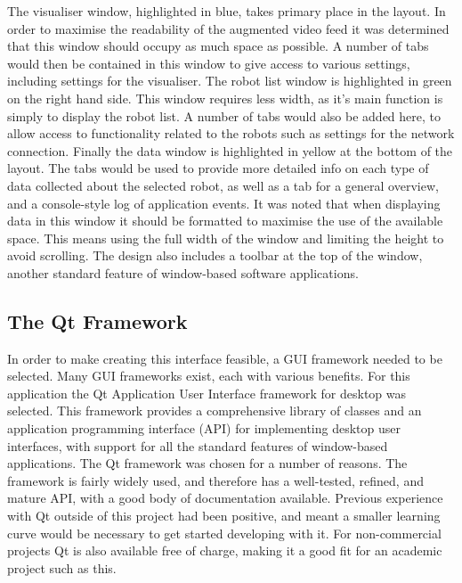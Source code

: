 The visualiser window, highlighted in blue, takes primary place in the layout. In order to maximise the readability of the augmented video feed it was determined that this window should occupy as much space as possible. A number of tabs would then be contained in this window to give access to various settings, including settings for the visualiser. The robot list window is highlighted in green on the right hand side. This window requires less width, as it's main function is simply to display the robot list. A number of tabs would also be added here, to allow access to functionality related to the robots such as settings for the network connection. Finally the data window is highlighted in yellow at the bottom of the layout. The tabs would be used to provide more detailed info on each type of data collected about the selected robot, as well as a tab for a general overview, and a console-style log of application events. It was noted that when displaying data in this window it should be formatted to maximise the use of the available space. This means using the full width of the window and limiting the height to avoid scrolling. The design also includes a toolbar at the top of the window, another standard feature of window-based software applications.

\subsection{The Qt Framework}
In order to make creating this interface feasible, a GUI framework needed to be selected. Many GUI frameworks exist, each with various benefits. For this application the Qt Application User Interface framework for desktop was selected. This framework provides a comprehensive library of classes and an application programming interface (API) for implementing desktop user interfaces, with support for all the standard features of window-based applications. The Qt framework was chosen for a number of reasons. The framework is fairly widely used, and therefore has a well-tested, refined, and mature API, with a good body of documentation available. Previous experience with Qt outside of this project had been positive, and meant a smaller learning curve would be necessary to get started developing with it. For non-commercial projects Qt is also available free of charge, making it a good fit for an academic project such as this.


